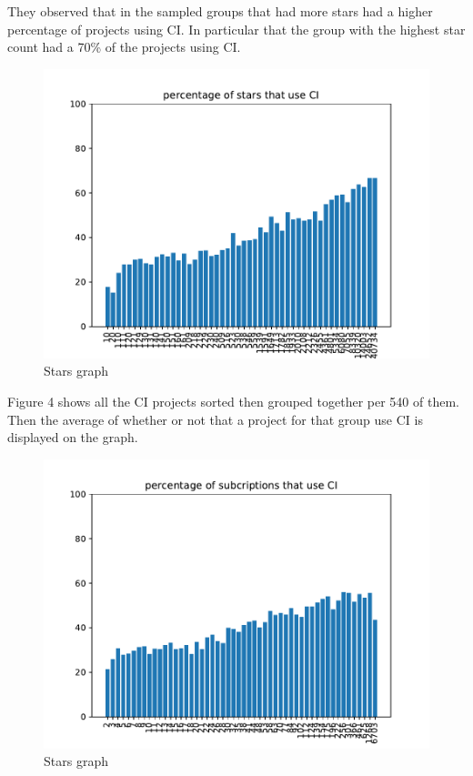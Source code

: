\documentclass[twoside,12pt,titlepage,a4paper]{article}
\begin{document}
They observed that in the sampled groups that had more stars had a higher percentage of projects using CI. In particular that the group with the highest star count had a 70\% of the projects using CI.  

\begin{figure}[!htbp]
  \centering
  \includegraphics[width=\textwidth]{../src/results/percentage stars with CI.pdf}
  \caption[alt text]{Stars graph}
\end{figure}

Figure 4 shows all the CI projects sorted then grouped together per 540 of them. Then the average of whether or not that a project for that group use CI is displayed on the graph. 

\begin{figure}[!htbp]
  \centering
  \includegraphics[width=\textwidth]{../src/results/percentage sub with CI.pdf}
  \caption[alt text]{Stars graph}
\end{figure}
\end{document}
